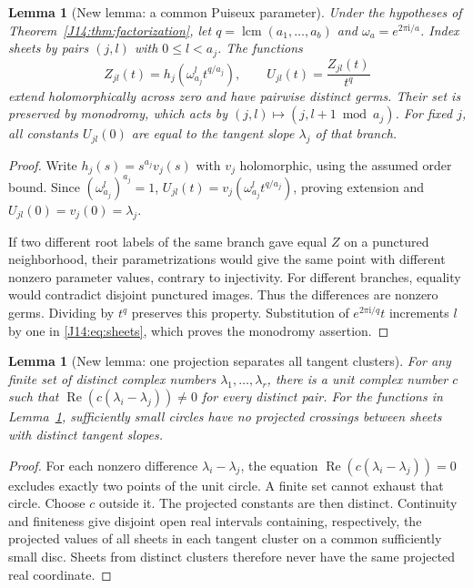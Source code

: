 \documentclass[11pt,oneside]{report}
\newtheorem{lemma}[theorem]{Lemma}
\theoremstyle{definition}
\numberwithin{equation}{section}
\newcommand{\ii}{\mathrm i}
\newcommand{\Ree}{\operatorname{Re}}
\begin{document}
\begin{lemma}[New lemma: a common Puiseux parameter]\label{J14:lem:common}
Under the hypotheses of Theorem~\ref{J14:thm:factorization}, let
$q=\operatorname{lcm}(a_1,\ldots,a_b)$ and
$\omega_a=e^{2\pi\ii/a}$. Index sheets by pairs $(j,l)$ with
$0\leq l<a_j$. The functions
\begin{equation}\label{J14:eq:sheets}
 Z_{jl}(t)=h_j(\omega_{a_j}^l t^{q/a_j}),\qquad
 U_{jl}(t)=\frac{Z_{jl}(t)}{t^q}
\end{equation}
extend holomorphically across zero and have pairwise distinct germs.
Their set is preserved by monodromy, which acts by
$(j,l)\mapsto(j,l+1\bmod a_j)$. For fixed $j$, all constants $U_{jl}(0)$
are equal to the tangent slope $\lambda_j$ of that branch.
\end{lemma}
\begin{proof}
Write $h_j(s)=s^{a_j}v_j(s)$ with $v_j$ holomorphic, using the assumed order
bound. Since $(\omega_{a_j}^l)^{a_j}=1$,
$U_{jl}(t)=v_j(\omega_{a_j}^l t^{q/a_j})$, proving extension and
$U_{jl}(0)=v_j(0)=\lambda_j$.

If two different root labels of the same branch gave equal $Z$ on a
punctured neighborhood, their parametrizations would give the same point
with different nonzero parameter values, contrary to injectivity. For
different branches, equality would contradict disjoint punctured images.
Thus the differences are nonzero germs. Dividing by $t^q$ preserves this
property. Substitution of $e^{2\pi\ii/q}t$ increments $l$ by one in
\eqref{J14:eq:sheets}, which proves the monodromy assertion.
\end{proof}

\begin{lemma}[New lemma: one projection separates all tangent clusters]
\label{J14:lem:projection}
For any finite set of distinct complex numbers $\lambda_1,\ldots,\lambda_r$,
there is a unit complex number $c$ such that
$\Ree(c(\lambda_i-\lambda_j))\ne0$ for every distinct pair.
For the functions in Lemma~\ref{J14:lem:common}, sufficiently small circles have
no projected crossings between sheets with distinct tangent slopes.
\end{lemma}
\begin{proof}
For each nonzero difference $\lambda_i-\lambda_j$, the equation
$\Ree(c(\lambda_i-\lambda_j))=0$ excludes exactly two points of the unit
circle. A finite set cannot exhaust that circle. Choose $c$ outside it.
The projected constants are then distinct. Continuity and finiteness give
disjoint open real intervals containing, respectively, the projected values
of all sheets in each tangent cluster on a common sufficiently small disc.
Sheets from distinct clusters therefore never have the same projected real
coordinate.
\end{proof}
\end{document}

